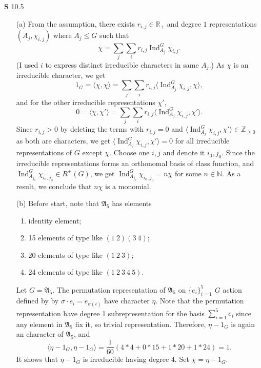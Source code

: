 \documentclass[a4paper, 12pt]{article}
\theoremstyle{Mydefinition}
\theoremstyle{Mytheorem}
\DeclareMathOperator{\Ind}{Ind}
\begin{document}
\noindent \textbf{S} 10.5
\begin{enumerate}
    \item[(a)] From the assumption, there exists $r_{i,j}\in\mathbb{R}_+$ and degree $1$ representations $(A_j, \chi_{i,j})$ where $A_j\leq G$ such that
    \begin{equation}
        \chi = \sum_j \sum_i r_{i,j} \Ind_{A_j}^G \chi_{i,j}.
    \end{equation}
    (I used $i$ to express distinct irreducible characters in same $A_j$.) As $\chi$ is an irreducible character, we get
    \begin{equation}
        1_G=\langle \chi, \chi\rangle = \sum_j\sum_i r_{i,j} \langle \Ind_{A_j}^G \chi_{i,j}, \chi\rangle,
    \end{equation}
    and for the other irreducible representations $\chi'$,
    \begin{equation}
        0=\langle \chi, \chi'\rangle = \sum_j\sum_i r_{i,j} \langle \Ind_{A_j}^G \chi_{i,j}, \chi'\rangle.
    \end{equation}
    Since $r_{i,j}>0$ by deleting the terms with $r_{i,j}=0$ and $\langle \Ind_{A_j}^G \chi_{i,j}, \chi'\rangle\in\mathbb{Z}_{\geq 0}$ as both are characters, we get $\langle \Ind_{A_j}^G \chi_{i,j}, \chi'\rangle=0$ for all irreducible representations of $G$ except $\chi$. Choose one $i,j$ and denote it $i_0,j_0$. Since the irreducible representations forms an orthonomal basis of class function, and $\Ind_{A_{j_0}}^G \chi_{i_0,j_0}\in R^+(G)$, we get $\Ind^G_{A_{j_0}} \chi_{i_0,j_0} = n\chi$ for some $n\in\mathbb{N}$. As a result, we conclude that $n\chi$ is a monomial.
    \item[(b)] Before start, note that $\mathfrak{A}_5$ has elements
    \begin{enumerate}
        \item identity element;
        \item 15 elements of type like $(1~2)(3~4)$;
        \item 20 elements of type like $(1~2~3)$;
        \item 24 elements of type like $(1~2~3~4~5)$.
    \end{enumerate}
    
    Let $G=\mathfrak{A}_5$. The permutation representation of $\mathfrak{A}_5$ on $\{e_i\}_{i=1}^5$ $G$ action defined by by $\sigma\cdot e_i = e_{\sigma(i)}$ have character $\eta$. Note that the permutation representation have degree 1 subrepresentation for the basis $\sum_{i=1}^5 e_i$ since any element in $\mathfrak{A}_5$ fix it, so trivial representation. Therefore, $\eta-1_G$ is again an character of $\mathfrak{A}_5$, and
    \begin{equation}
        \langle \eta-1_G, \eta-1_G\rangle = \frac{1}{60}\left(4*4 + 0 * 15 + 1 * 20 + 1 * 24\right) = 1.
    \end{equation}
    It shows that $\eta-1_G$ is irreducible having degree 4. Set $\chi = \eta-1_G$.
    

\end{enumerate}
\end{document}
